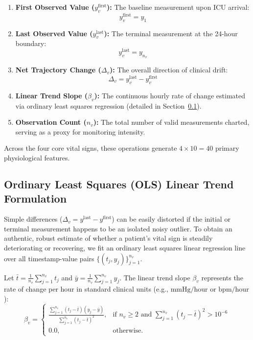 \documentclass[12pt,a4paper,oneside]{report}
\begin{document}
\begin{enumerate}
    \item \textbf{First Observed Value ($y_v^{\text{first}}$):} The baseline measurement upon ICU arrival:
    \begin{equation}
    y_v^{\text{first}} = y_1
    \end{equation}
    
    \item \textbf{Last Observed Value ($y_v^{\text{last}}$):} The terminal measurement at the 24-hour boundary:
    \begin{equation}
    y_v^{\text{last}} = y_{n_v}
    \end{equation}
    
    \item \textbf{Net Trajectory Change ($\Delta_v$):} The overall direction of clinical drift:
    \begin{equation}
    \Delta_v = y_v^{\text{last}} - y_v^{\text{first}}
    \end{equation}
    
    \item \textbf{Linear Trend Slope ($\beta_v$):} The continuous hourly rate of change estimated via ordinary least squares regression (detailed in Section~\ref{subsec:ols_trend}).
    
    \item \textbf{Observation Count ($n_v$):} The total number of valid measurements charted, serving as a proxy for monitoring intensity.
\end{enumerate}

Across the four core vital signs, these operations generate $4 \times 10 = 40$ primary physiological features.

\subsection{Ordinary Least Squares (OLS) Linear Trend Formulation}
\label{subsec:ols_trend}

Simple differences ($\Delta_v = y^{\text{last}} - y^{\text{first}}$) can be easily distorted if the initial or terminal measurement happens to be an isolated noisy outlier. To obtain an authentic, robust estimate of whether a patient's vital sign is steadily deteriorating or recovering, we fit an ordinary least squares linear regression line over all timestamp-value pairs $\{(t_j, y_j)\}_{j=1}^{n_v}$.

Let $\bar{t} = \frac{1}{n_v} \sum_{j=1}^{n_v} t_j$ and $\bar{y} = \frac{1}{n_v} \sum_{j=1}^{n_v} y_j$. The linear trend slope $\beta_v$ represents the rate of change per hour in standard clinical units (e.g., $\text{mmHg}/\text{hour}$ or $\text{bpm}/\text{hour}$):
\begin{equation}
\label{eq:ols_slope}
\beta_v = 
\begin{cases}
\frac{\sum_{j=1}^{n_v} (t_j - \bar{t})(y_j - \bar{y})}{\sum_{j=1}^{n_v} (t_j - \bar{t})^2}, & \text{if } n_v \ge 2 \text{ and } \sum_{j=1}^{n_v} (t_j - \bar{t})^2 > 10^{-6} \\
0.0, & \text{otherwise.}
\end{cases}
\end{equation}
\end{document}
